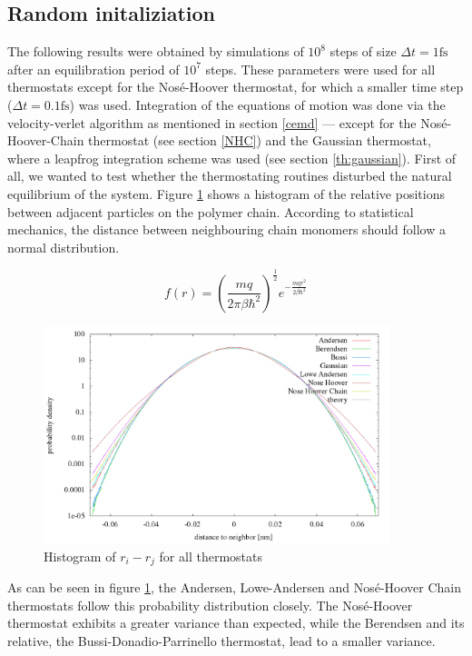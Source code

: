 % 
\graphicspath{{../graphics/}}


\subsection{Random initaliziation}
The following results were obtained by simulations of $10^8$ steps of size $\Delta t = 1 \text{fs}$ after an equilibration period of $10^7$ steps. These parameters were used for all thermostats except for the Nosé-Hoover thermostat, for which a smaller time step ($\Delta t = 0.1 \text{fs}$) was used. Integration of the equations of motion was done via the velocity-verlet algorithm as mentioned in section \ref{cemd} --- except for the Nosé-Hoover-Chain thermostat (see section \ref{NHC}) and the Gaussian thermostat, where a leapfrog integration scheme was used (see section \ref{th:gaussian}).   
First of all, we wanted to test whether the thermostating routines disturbed the natural equilibrium of the system. Figure \ref{im:relPos_rand} shows a histogram of the relative positions between adjacent particles on the polymer chain. According to statistical mechanics, the distance between neighbouring chain monomers should follow a normal distribution.

\begin{equation}
f(r) = \left(\frac{mq}{2\pi\beta\hbar^2}\right)^{\frac{1}{2}}e^{-\frac{mqr^2}{2\beta\hbar^2}}
\end{equation}  

\begin{figure}[H]
\centering
\includegraphics[width=0.9\textwidth]{./graphics/Histogramm_relPos_rand_T=20_p=64.png}
\caption{Histogram of $r_i - r_j$ for all thermostats}
\label{im:relPos_rand}
\end{figure} 
As can be seen in figure \ref{im:relPos_rand}, the Andersen, Lowe-Andersen and Nosé-Hoover Chain thermostats follow this probability distribution closely. The Nosé-Hoover thermostat exhibits a greater variance than expected, while the Berendsen and its relative, the Bussi-Donadio-Parrinello thermostat,  lead to a smaller variance. 

